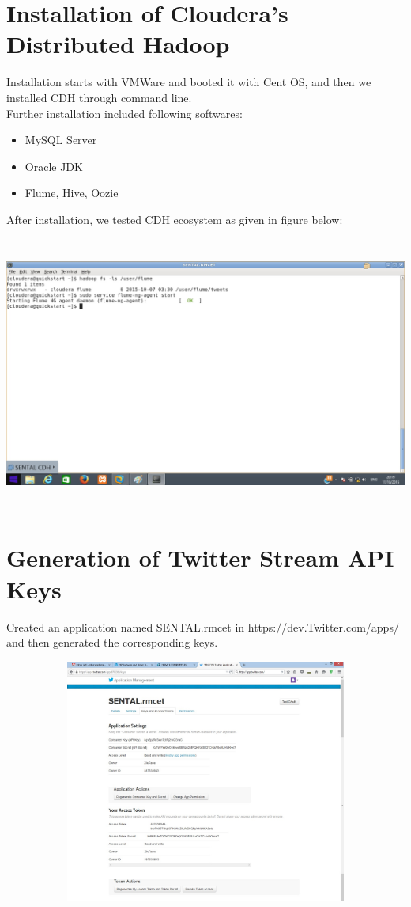 \documentclass[a4paper,12pt]{report}
\begin{document}
\section{Installation of Cloudera’s Distributed Hadoop}
Installation starts with VMWare and booted it with Cent OS, and then we installed CDH through command line.\\
\hspace*{\parindent}Further installation included following softwares:
\begin{itemize}
	\item MySQL Server
	\item Oracle JDK
	\item Flume, Hive, Oozie
\end{itemize}
After installation, we tested CDH ecosystem as given in figure  below:
\begin{center}
	\includegraphics[height=9cm]{images/installation.jpg}
\end{center}
\section{Generation of Twitter Stream API Keys}
Created an application named SENTAL.rmcet in https://dev.Twitter.com/apps/ and then generated the corresponding keys.
\begin{center}
	\includegraphics[height=8cm,width=16cm]{images/twitterapi.jpg}
\end{center}
\end{document}
